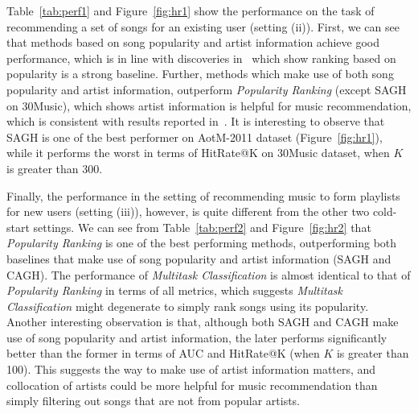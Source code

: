 Table~\ref{tab:perf1} and Figure~\ref{fig:hr1} show the performance on the task of recommending a set of songs for
an existing user (setting (ii)).
First, we can see that methods based on song popularity and artist information achieve good performance,
which is in line with discoveries in~\cite{bonnin2013evaluating,jannach2015beyond,bonnin2015automated} which 
show ranking based on popularity is a strong baseline.
Further, methods which make use of both song popularity and artist information,
outperform {\it Popularity Ranking} (except SAGH on 30Music), which shows artist information is helpful for music recommendation,
which is consistent with results reported in~\cite{bonnin2013evaluating,bonnin2015automated}.
%
It is interesting to observe that SAGH is one of the best performer on AotM-2011 dataset (Figure~\ref{fig:hr1}), 
while it performs the worst in terms of HitRate@K on 30Music dataset, when $K$ is greater than 300.
%




Finally, the performance in the setting of recommending music to form playlists for new users (setting (iii)),
however, is quite different from the other two cold-start settings.
%
We can see from Table~\ref{tab:perf2} and Figure~\ref{fig:hr2} that {\it Popularity Ranking} is one of the best performing methods,
outperforming both baselines that make use of song popularity and artist information (\ie SAGH and CAGH).
The performance of {\it Multitask Classification} is almost identical to that of {\it Popularity Ranking} in terms of all metrics,
which suggests {\it Multitask Classification} might degenerate to simply rank songs using its popularity.
Another interesting observation is that, although both SAGH and CAGH make use of song popularity and artist information,
the later performs significantly better than the former in terms of AUC and HitRate@K (when $K$ is greater than 100).
This suggests the way to make use of artist information matters,
and collocation of artists could be more helpful for music recommendation than simply filtering out songs 
that are not from popular artists.

